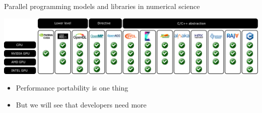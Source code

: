 \documentclass[
    aspectratio=169,
    handout,
]{beamer}
\begin{document}

\begin{frame}{Parallel programming models and libraries in numerical science}
    \begin{center}
        \includegraphics[width=\textwidth]{prog_model.png}
    \end{center}
    \begin{itemize}
        \item Performance portability is one thing
        \item But we will see that developers need more
    \end{itemize}
\end{frame}

\end{document}
